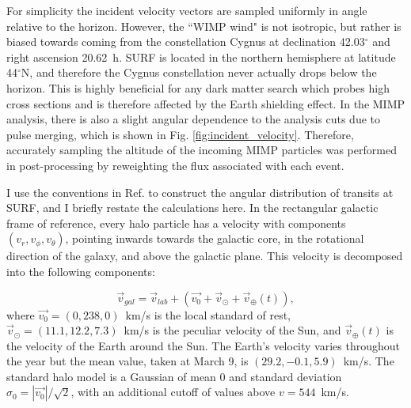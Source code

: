 For simplicity the incident velocity vectors are sampled uniformly in angle relative to the horizon.
However, the ``WIMP wind" is not isotropic, but rather is biased towards coming from the constellation Cygnus at declination 42.03$^\circ$ and right ascension 20.62~h\cite{baxter_recommended_2021}.
SURF is located in the northern hemisphere at latitude 44$^\circ$N, and therefore the Cygnus constellation never actually drops below the horizon.
This is highly beneficial for any dark matter search which probes high cross sections and is therefore affected by the Earth shielding effect.
In the MIMP analysis, there is also a slight angular dependence to the analysis cuts due to pulse merging, which is shown in Fig. \ref{fig:incident_velocity}.
Therefore, accurately sampling the altitude of the incoming MIMP particles was performed in post-processing by reweighting the flux associated with each event.

I use the conventions in Ref. \cite{baxter_recommended_2021} to construct the angular distribution of transits at SURF, and I briefly restate the calculations here.
In the rectangular galactic frame of reference, every halo particle has a velocity with components $(v_r, v_\phi, v_\theta)$, pointing inwards towards the galactic core, in the rotational direction of the galaxy, and above the galactic plane.
This velocity is decomposed into the following components:

\begin{equation}
    \vec{v}_{gal} = \vec{v}_{lab} + (\vec{v_0} + \vec{v}_{\odot} + \vec{v}_{\oplus}(t)) ,
    \label{eq:galaxy_velocity}
\end{equation}
\noindent
where $\vec{v_0}=(0,238,0)$~km/s is the local standard of rest, $ \vec{v}_{\odot}=(11.1, 12.2, 7.3)$~km/s is the peculiar velocity of the Sun, and $ \vec{v}_{\oplus}(t) $ is the velocity of the Earth around the Sun.
The Earth's velocity varies throughout the year but the mean value, taken at March 9, is $(29.2, -0.1, 5.9)$~km/s.
The standard halo model \cite{mccabe_earths_2014} is a Gaussian of mean 0 and standard deviation $\sigma_0 = |\vec {v_0}|/\sqrt{2}$, with an additional cutoff of values above $v=544$~km/s.

